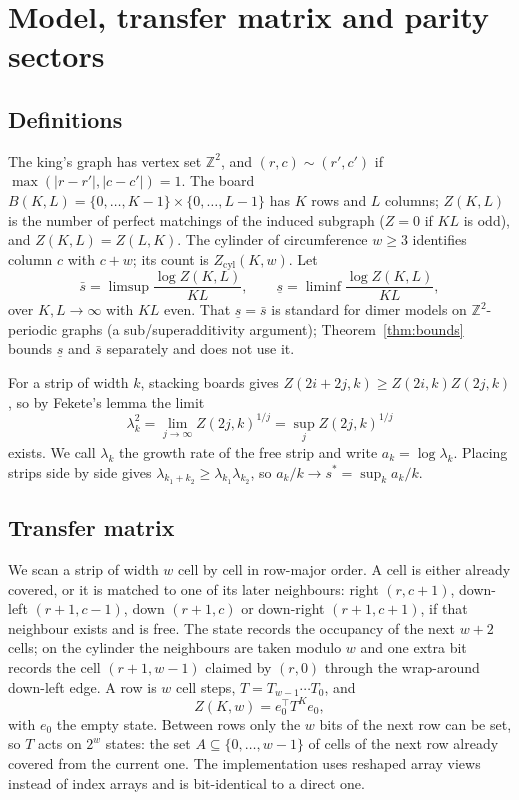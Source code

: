 \documentclass[11pt]{amsart}
\theoremstyle{definition}
\theoremstyle{remark}
\newcommand{\Z}{\mathbb{Z}}
\begin{document}
\section{Model, transfer matrix and parity sectors}\label{sec:model}

\subsection{Definitions}
The king's graph has vertex set $\Z^2$, and $(r, c) \sim (r', c')$ if
$\max(|r - r'|, |c - c'|) = 1$. The board $B(K, L) = \{0, \dots, K-1\} \times \{0, \dots, L-1\}$
has $K$ rows and $L$ columns; $Z(K, L)$ is the number of perfect matchings of the induced
subgraph ($Z = 0$ if $KL$ is odd), and $Z(K, L) = Z(L, K)$. The cylinder of circumference
$w \ge 3$ identifies column $c$ with $c + w$; its count is $Z_{\mathrm{cyl}}(K, w)$. Let
\[
  \bar s = \limsup \frac{\log Z(K, L)}{KL}, \qquad \underline s = \liminf \frac{\log Z(K, L)}{KL},
\]
over $K, L \to \infty$ with $KL$ even. That $\underline s = \bar s$ is standard for dimer models
on $\Z^2$-periodic graphs (a sub/superadditivity argument); Theorem~\ref{thm:bounds} bounds
$\underline s$ and $\bar s$ separately and does not use it.

For a strip of width $k$, stacking boards gives $Z(2i + 2j, k) \ge Z(2i, k) Z(2j, k)$, so by
Fekete's lemma \cite{fekete1923} the limit
\begin{equation}\label{eq:lambda}
  \lambda_k^2 = \lim_{j \to \infty} Z(2j, k)^{1/j} = \sup_j Z(2j, k)^{1/j}
\end{equation}
exists. We call $\lambda_k$ the growth rate of the free strip and write $a_k = \log \lambda_k$.
Placing strips side by side gives $\lambda_{k_1 + k_2} \ge \lambda_{k_1}\lambda_{k_2}$, so
$a_k/k \to s^* = \sup_k a_k/k$.

\subsection{Transfer matrix}
We scan a strip of width $w$ cell by cell in row-major order. A cell is either already covered,
or it is matched to one of its later neighbours: right $(r, c+1)$, down-left $(r+1, c-1)$, down
$(r+1, c)$ or down-right $(r+1, c+1)$, if that neighbour exists and is free. The state records
the occupancy of the next $w + 2$ cells; on the cylinder the neighbours are taken modulo $w$ and
one extra bit records the cell $(r+1, w-1)$ claimed by $(r, 0)$ through the wrap-around
down-left edge. A row is $w$ cell steps, $T = T_{w-1}\cdots T_0$, and
\[
  Z(K, w) = e_0^{\top} T^K e_0,
\]
with $e_0$ the empty state. Between rows only the $w$ bits of the next row can be set, so $T$
acts on $2^w$ states: the set $A \subseteq \{0, \dots, w-1\}$ of cells of the next row already
covered from the current one. The implementation uses reshaped array views instead of index
arrays and is bit-identical to a direct one.
\end{document}
